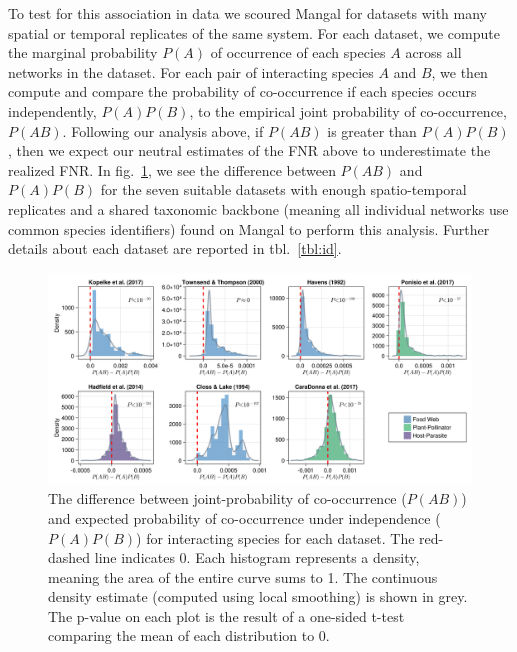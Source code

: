\documentclass[10pt,oneside]{article}
\makeatletter
\def\maxwidth{\ifdim\Gin@nat@width>\linewidth\linewidth
\else\Gin@nat@width\fi}
\let\Oldincludegraphics\includegraphics
\renewcommand{\includegraphics}[1]{\Oldincludegraphics[width=\maxwidth]{#1}}
\makeatother
\begin{document}
To test for this association in data we scoured Mangal for datasets with
many spatial or temporal replicates of the same system. For each
dataset, we compute the marginal probability \(P(A)\) of occurrence of
each species \(A\) across all networks in the dataset. For each pair of
interacting species \(A\) and \(B\), we then compute and compare the
probability of co-occurrence if each species occurs independently,
\(P(A)P(B)\), to the empirical joint probability of co-occurrence,
\(P(AB)\). Following our analysis above, if \(P(AB)\) is greater than
\(P(A)P(B)\), then we expect our neutral estimates of the FNR above to
underestimate the realized FNR. In fig.~\ref{fig:mangal}, we see the
difference between \(P(AB)\) and \(P(A)P(B)\) for the seven suitable
datasets with enough spatio-temporal replicates and a shared taxonomic
backbone (meaning all individual networks use common species
identifiers) found on Mangal to perform this analysis. Further details
about each dataset are reported in tbl.~\ref{tbl:id}.

\begin{figure}
\hypertarget{fig:mangal}{%
\centering
\includegraphics{./figures/fig2.png}
\caption{The difference between joint-probability of co-occurrence
(\(P(AB)\)) and expected probability of co-occurrence under independence
(\(P(A)P(B)\)) for interacting species for each dataset. The red-dashed
line indicates 0. Each histogram represents a density, meaning the area
of the entire curve sums to 1. The continuous density estimate (computed
using local smoothing) is shown in grey. The p-value on each plot is the
result of a one-sided t-test comparing the mean of each distribution to
0.}\label{fig:mangal}
}
\end{figure}
\end{document}
